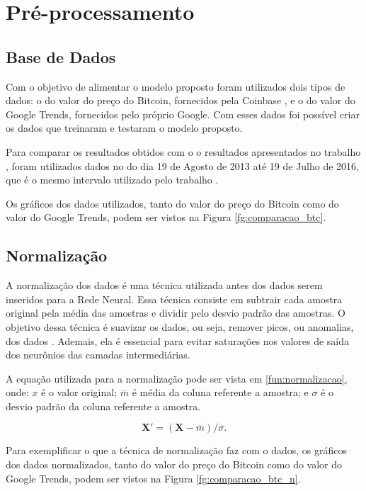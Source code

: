 \section{Pré-processamento}

\subsection{Base de Dados}
\label{subsec:base_de_dados}
 Com o objetivo de alimentar o modelo proposto foram utilizados dois tipos de dados: o do valor do preço do Bitcoin, fornecidos pela Coinbase \cite{Coinbase}, e o do valor do Google Trends, fornecidos pelo próprio Google. Com esses dados foi possível criar os dados que treinaram e testaram o modelo proposto.
 
Para comparar os resultados obtidos com o o resultados apresentados no trabalho \cite{wilson_yelowitz_2014}, foram utilizados dados no do dia 19 de Agosto de 2013 até 19 de Julho de 2016, que é o mesmo intervalo utilizado pelo trabalho \cite{wilson_yelowitz_2014}.
 
 Os gráficos dos dados utilizados, tanto do valor do preço do Bitcoin como do valor do Google Trends, podem ser vistos na Figura \ref{fg:comparacao_btc}.
 
 \subsection{Normalização}
 \label{subsec:normalizacao}
A normalização dos dados é uma técnica utilizada antes dos dados serem inseridos para a Rede Neural. Essa técnica consiste em subtrair cada amostra original pela média das amostras e dividir pelo desvio padrão das amostras. O objetivo dessa técnica é suavizar os dados, ou seja, remover picos, ou anomalias, dos dados \cite{quackenbush2002microarray}. Ademais, ela é essencial para evitar saturações nos valores de saída dos neurônios das camadas intermediárias.

A equação utilizada para a normalização pode ser vista em \eqref{fun:normalizacao}, onde: $x$ é o valor original; $\overline{m}$ é média da coluna referente a amostra; e $\sigma$ é o desvio padrão da coluna referente a amostra. 

\begin{equation}
    \label{fun:normalizacao}
 \mathbf{X'} = (\mathbf{X}-\overline{m})/\sigma.
\end{equation}

Para exemplificar o que a técnica de normalização faz com o dados, os gráficos dos dados normalizados, tanto do valor do preço do Bitcoin como do valor do Google Trends, podem ser vistos na Figura \ref{fg:comparacao_btc_n}.

